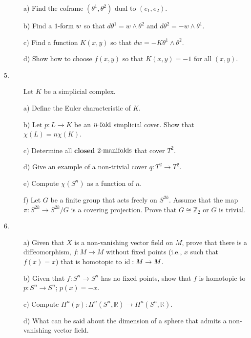 \documentclass[12pt]{article}
\def\R{\mathbb R}
\def\Z{\mathbb Z}
\begin{document}
\begin{large}
\begin{description}
\item[\quad] a)
Find the coframe $(\theta^1,\theta^2)$ dual to $(e_1,e_2)$.

\item[\quad] b)
Find a $1\hbox{-form } w$ so that $d\theta^1=w\wedge\theta^2$ and
$d\theta^2=-w\wedge\theta^1$.

\item[\quad] c)
Find a function $K(x,y)$ so that $dw=-K\theta^1\wedge \theta^2$.

\item[\quad] d)
Show how to choose $f(x,y)$ so that $K(x,y)=-1$ for all $(x,y)$.


\vfill\eject

\item[5.]
Let $K$ be a simplicial complex.

\item[\quad] a)
Define the Euler characteristic of $K$.

\item[\quad] b)
Let $p:L\to K$ be an $n\hbox{-fold}$ simplicial cover.
Show that $\chi(L)=n\chi(K)$.

\item[\quad] c)
Determine all {\bf closed} $2\hbox{-manifolds}$ that cover $T^2$.

\item[\quad] d)
Give an example of a non-trivial cover $q:T^2\to T^2$.

\item[\quad] e)
Compute $\chi(S^n)$ as a function of $n$.

\item[\quad] f)
Let $G$ be a finite group that acts freely on $S^{2k}$.
Assume that the map $\pi:S^{2k}\to S^{2k}/G$ is a covering projection.
Prove that $G\cong \Z_2$ or $G$ is trivial.


\item[6.] a)
Given that $X$ is a non-vanishing vector field on $M$, prove that there
is a diffeomorphism, $f:M\to M$ without fixed points (i.e., $x$ such that
$f(x)=x$) that is homotopic to $\hbox{id}:M\to M$.

\item[\quad] b)
Given that $f:S^n\to S^n$ has no fixed points, show that $f$ is homotopic
to $p:S^n\to S^n$; $p(x)=-x$.

\item[\quad] c)
Compute $H^n(p):H^n(S^n,\R)\to H^n(S^n,\R)$.

\item[\quad] d)
What can be said about the dimension of a sphere that admits
a non-vanishing vector field.


\end{description}
\end{large}
\end{document}
